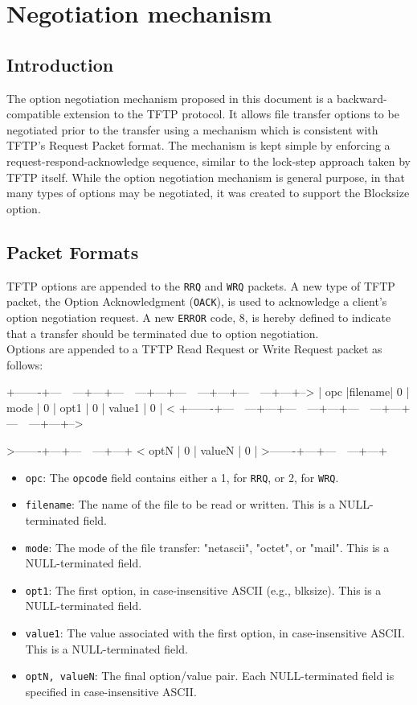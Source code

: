 \documentclass[12pt]{article}
\begin{document}
\section{Negotiation mechanism}
\subsection{Introduction}
The option negotiation mechanism proposed in this document is a backward-compatible extension to the TFTP protocol. It allows file transfer options to be negotiated prior to the transfer using a mechanism which is consistent with TFTP's Request Packet format. The mechanism is kept simple by enforcing a request-respond-acknowledge sequence, similar to the lock-step approach taken by TFTP itself. While the option negotiation mechanism is general purpose, in that many types of options may be negotiated, it was created to support the Blocksize option.\\

\subsection{Packet Formats}
TFTP options are appended to the \verb|RRQ| and \verb|WRQ| packets. A new type of TFTP packet, the Option Acknowledgment (\verb|OACK|), is used to acknowledge a client's option negotiation request. A new  \verb|ERROR| code, 8, is hereby defined to indicate that a transfer should be terminated due to option negotiation.\\

Options are appended to a TFTP Read Request or Write Request packet as follows:

   +-------+---~~---+---+---~~---+---+---~~---+---+---~~---+---+-->
   | opc |filename| 0 | mode | 0 | opt1 | 0 | value1 | 0 | <
   +-------+---~~---+---+---~~---+---+---~~---+---+---~~---+---+-->

    >-------+---+---~~---+---+
   < optN | 0 | valueN | 0 |
    >-------+---+---~~---+---+
\begin{itemize}
\item \verb|opc|: The \verb|opcode| field contains either a 1, for \verb|RRQ|, or 2, for \verb|WRQ|.
\item \verb|filename|: The name of the file to be read or written. This is a NULL-terminated field.
\item \verb|mode|: The mode of the file transfer: "netascii", "octet", or "mail". This is a NULL-terminated field.
\item \verb|opt1|: The first option, in case-insensitive ASCII (e.g., blksize). This is a NULL-terminated field.
\item \verb|value1|: The value associated with the first option, in case-insensitive ASCII. This is a NULL-terminated field.
\item \verb|optN, valueN|: The final option/value pair. Each NULL-terminated field is specified in case-insensitive ASCII.
\end{itemize}
\end{document}
